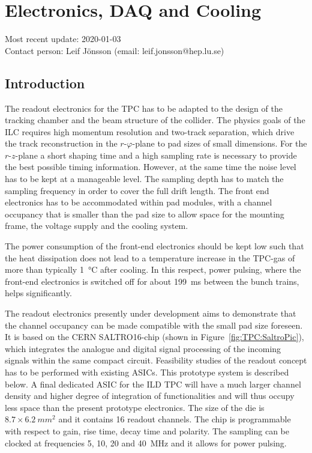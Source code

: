 \section{Electronics, DAQ and Cooling}
\label{chap:TPC_sec:electronics}
Most recent update: 2020-01-03 \\
Contact person: Leif J{\"o}nsson (email: leif.jonsson@hep.lu.se)

\subsection{Introduction}
The readout electronics for the TPC has to be adapted to the design of the tracking chamber and the beam structure of the collider. The physics goals of the ILC requires high momentum resolution and two-track separation, which drive the track reconstruction in the $r\text{-}\varphi$-plane to pad sizes of small dimensions. For the $r\text{-}z$-plane a short shaping time and a high sampling rate is necessary to provide the best possible timing information. However, at the same time the noise level has to be kept at a manageable level. The sampling depth has to match the sampling frequency in order to cover the full drift length. The front end electronics has to be accommodated within pad modules, with a channel occupancy that is smaller than the pad size to allow space for the mounting frame, the voltage supply and the cooling system.

The power consumption of the front-end electronics should be kept low such that the heat dissipation does not lead to a temperature increase in the TPC-gas of more than typically \SI{1}{\degreeCelsius} after cooling. In this respect, power pulsing, where the front-end electronics is switched off for about \SI{199}{ms} between the bunch trains, helps significantly.

The readout electronics presently under development aims to demonstrate that the channel occupancy can be made compatible with the small pad size foreseen. It is based on the CERN SALTRO16-chip (shown in Figure~\ref{fig:TPC:SaltroPic}), which integrates the analogue and digital signal processing of the incoming signals within the same compact circuit. Feasibility studies of the readout concept has to be performed with existing ASICs. This prototype system is described below. A final dedicated ASIC for the ILD TPC will have a much larger channel density and higher degree of integration of functionalities and will thus occupy less space than the present prototype electronics. The size of the die is $8.7 \times \SI{6.2}{mm^2}$ and it contains 16 readout channels. The chip is programmable with respect to gain, rise time, decay time and polarity. The sampling can be clocked at frequencies 5, 10, 20 and \SI{40}{MHz} and it allows for power pulsing.

